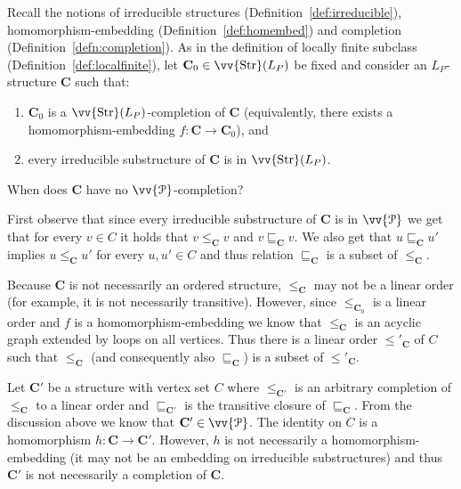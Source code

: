 \documentclass{elsarticle}
\def\Str{\mathop{\mathrm{Str}}\nolimits}
\def\ordclass#1{\vv{#1}}
\def\str#1{\mathbf {#1}}
\theoremstyle{plain}
\theoremstyle{definition}
\theoremstyle{remark}
\begin{document}
\medskip

Recall the notions of irreducible structures (Definition~\ref{def:irreducible}), homomorphism-embedding (Definition~\ref{def:homembed}) and completion (Definition~\ref{defn:completion}).
As in the definition of locally finite subclass (Definition~\ref{def:localfinite}), let $\str{C}_0\in
\ordclass{\Str}(L_P)$ be fixed and consider an $L_P$-structure $\str{C}$ such that:
\begin{enumerate}
\item $\str{C}_0$ is a $\ordclass{\Str}(L_P)$-completion of $\str{C}$ (equivalently, there exists a homo\-mor\-phism-embedding $f\colon\str{C}\to\str{C}_0$), and
\item every irreducible substructure of $\str{C}$ is in $\ordclass{\Str}(L_P)$.
\end{enumerate}
When does $\str{C}$ have no $\ordclass{\mathcal P}$-completion?

First observe that since every irreducible substructure of $\str{C}$ is in $\ordclass{\mathcal
P}$ we get that for every $v\in C$ it holds that $v \leq_\str{C} v$ and
$v \sqsubseteq_\str{C} v$. We also get that $u \sqsubseteq_\str{C} u'$ implies
$u \leq_\str{C} u'$ for every $u,u'\in C$ and thus relation $\sqsubseteq_\str{C}$ is a subset of $\leq_\str{C}$.

Because $\str{C}$ is not necessarily an ordered structure, $\leq_\str{C}$ may not be a linear order (for example, it is not necessarily transitive).
However, since $\leq_{\str{C}_0}$ is a linear order and $f$ is a
homomorphism-embedding we know that $\leq_\str{C}$ is an acyclic graph extended by loops on all vertices. Thus there is a linear order $\leq'_\str{C}$ of $C$ such that $\leq_\str{C}$ (and consequently also $\sqsubseteq_\str{C}$) is a subset of $\leq'_\str{C}$. 

Let $\str{C}'$ be a structure with vertex set $C$ where $\leq_{\str{C}'}$ is
an arbitrary completion of $\leq_\str{C}$ to a linear order and $\sqsubseteq_{\str{C}'}$
is the transitive closure of $\sqsubseteq_{\str{C}}$.
From the discussion above we know that
$\str{C}'\in \ordclass{\mathcal P}$. The identity on $C$ is a homomorphism $h\colon\str{C}\to\str{C}'$.
However, $h$ is not necessarily a homomorphism-embedding (it may not be an embedding on irreducible substructures) and thus
$\str{C}'$ is not necessarily a completion of $\str{C}$.
\end{document}
